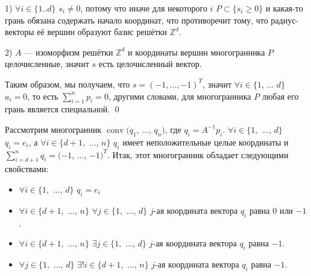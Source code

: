 \documentclass[12pt,notitlepage]{article}
\DeclareMathOperator{\conv}{conv}
\begin{document}
	1) $\forall i \in \{1 .. d\}$ $s_i \neq 0$, потому что иначе для некоторого $i$ $P \subset \{s_i \geq 0\}$ и какая-то грань обязана содержать начало координат, что противоречит тому, что радиус-векторы её вершин образуют базис решётки $\mathbb{Z}^d$.
	
	2) $A$ --- изоморфизм решётки $\mathbb{Z}^d$ и координаты вершин многогранника $P$ целочисленные, значит $s$ есть целочисленный вектор.
	
	Таким образом, мы получаем, что $s = (-1, ..., -1)^T$, значит $\forall i \in \{1$, ... $d\}$ $a_i = 0$, то есть $\sum_{i = 1}^{n} p_i = 0$, другими словами, для многогранника $P$ любая его грань является специальной. \qed
	
	\vspace{0.3cm}
	Рассмотрим многогранник $\conv(q_1$, ..., $q_n)$, где $q_i = A^{-1}p_i$. $\forall i \in \{1,$ ..., $d\}$ $q_i = e_i$, а $\forall i \in \{d + 1,$ ..., $n\}$ $q_i$ имеет неположительные целые координаты и $\sum_{i = d + 1}^n q_i = (-1$, ..., $-1)^T$. Итак, этот многогранник обладает следующими свойствами:
	
	\begin{itemize}
		\item $\forall i \in \{1,$ ..., $d\}$ $q_i = e_i$
		
		\item $\forall i \in \{d + 1,$ ..., $n\}$ $\forall j \in \{1,$ ..., $d\}$ $j$-ая координата вектора $q_i$ равна $0$ или $-1$.
		
		\item $\forall i \in \{d + 1,$ ..., $n\}$ $\exists j \in \{1,$ ..., $d\}$ $j$-ая координата вектора $q_i$ равна $-1$.
		
		\item $\forall j \in \{1,$ ..., $d\}$ $\exists ! i \in \{d + 1,$ ..., $n\}$ $j$-ая координата вектора $q_i$ равна $-1$.
	\end{itemize}
	
\end{document}
